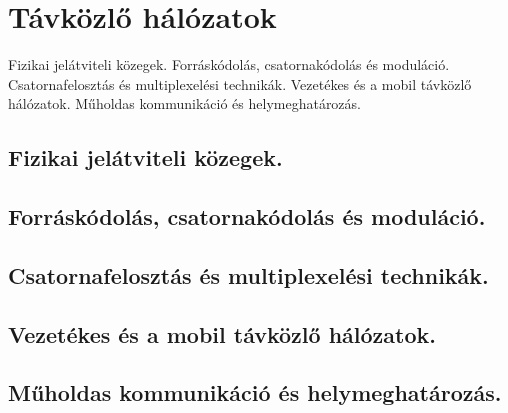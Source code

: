 \section{Távközlő hálózatok}
{\footnotesize Fizikai jelátviteli közegek. Forráskódolás, csatornakódolás és moduláció. Csatornafelosztás és multiplexelési technikák. Vezetékes és a mobil távközlő hálózatok. Műholdas kommunikáció és helymeghatározás.}
\subsection{Fizikai jelátviteli közegek.}

\subsection{Forráskódolás, csatornakódolás és moduláció.}

\subsection{Csatornafelosztás és multiplexelési technikák.}

\subsection{Vezetékes és a mobil távközlő hálózatok.}

\subsection{Műholdas kommunikáció és helymeghatározás.}

